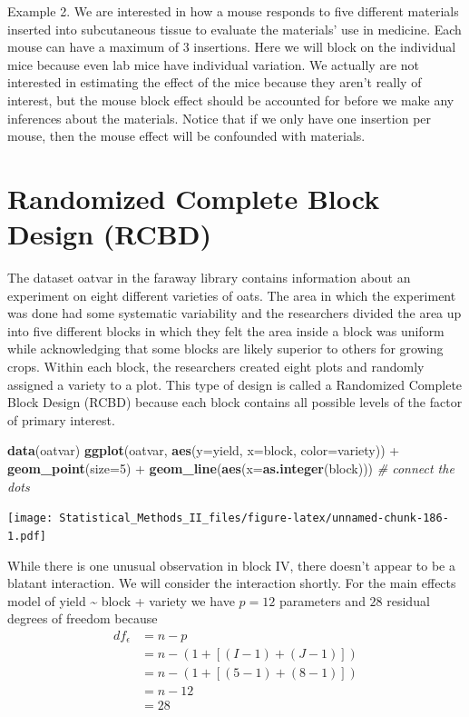 \documentclass[]{book}
\newenvironment{Shaded}{\begin{snugshade}}{\end{snugshade}}
\newcommand{\KeywordTok}[1]{\textcolor[rgb]{0.13,0.29,0.53}{\textbf{{#1}}}}
\newcommand{\DataTypeTok}[1]{\textcolor[rgb]{0.13,0.29,0.53}{{#1}}}
\newcommand{\DecValTok}[1]{\textcolor[rgb]{0.00,0.00,0.81}{{#1}}}
\newcommand{\StringTok}[1]{\textcolor[rgb]{0.31,0.60,0.02}{{#1}}}
\newcommand{\CommentTok}[1]{\textcolor[rgb]{0.56,0.35,0.01}{\textit{{#1}}}}
\newcommand{\NormalTok}[1]{{#1}}
\theoremstyle{definition}
\theoremstyle{definition}
\theoremstyle{remark}
\begin{document}
Example 2. We are interested in how a mouse responds to five different
materials inserted into subcutaneous tissue to evaluate the materials'
use in medicine. Each mouse can have a maximum of 3 insertions. Here we
will block on the individual mice because even lab mice have individual
variation. We actually are not interested in estimating the effect of
the mice because they aren't really of interest, but the mouse block
effect should be accounted for before we make any inferences about the
materials. Notice that if we only have one insertion per mouse, then the
mouse effect will be confounded with materials.

\section{Randomized Complete Block Design
(RCBD)}\label{randomized-complete-block-design-rcbd}

The dataset oatvar in the faraway library contains information about an
experiment on eight different varieties of oats. The area in which the
experiment was done had some systematic variability and the researchers
divided the area up into five different blocks in which they felt the
area inside a block was uniform while acknowledging that some blocks are
likely superior to others for growing crops. Within each block, the
researchers created eight plots and randomly assigned a variety to a
plot. This type of design is called a Randomized Complete Block Design
(RCBD) because each block contains all possible levels of the factor of
primary interest.

\begin{Shaded}
\begin{Highlighting}[]
\KeywordTok{data}\NormalTok{(oatvar)}
\KeywordTok{ggplot}\NormalTok{(oatvar, }\KeywordTok{aes}\NormalTok{(}\DataTypeTok{y=}\NormalTok{yield, }\DataTypeTok{x=}\NormalTok{block, }\DataTypeTok{color=}\NormalTok{variety)) +}\StringTok{ }
\StringTok{    }\KeywordTok{geom_point}\NormalTok{(}\DataTypeTok{size=}\DecValTok{5}\NormalTok{) +}
\StringTok{    }\KeywordTok{geom_line}\NormalTok{(}\KeywordTok{aes}\NormalTok{(}\DataTypeTok{x=}\KeywordTok{as.integer}\NormalTok{(block))) }\CommentTok{# connect the dots}
\end{Highlighting}
\end{Shaded}

\texttt{[image: Statistical\_Methods\_II\_files/figure-latex/unnamed-chunk-186-1.pdf]}

While there is one unusual observation in block IV, there doesn't appear
to be a blatant interaction. We will consider the interaction shortly.
For the main effects model of yield \textasciitilde{} block + variety we
have \(p=12\) parameters and \(28\) residual degrees of freedom because
\[\begin{aligned}
  df_\epsilon   &=  n-p \\
        &=  n-\left(1+\left[\left(I-1\right)+\left(J-1\right)\right]\right) \\
        &=  n-\left(1+\left[\left(5-1\right)+\left(8-1\right)\right]\right) \\
        &=  n-12 \\
        &=  28
 \end{aligned}\]
\end{document}
